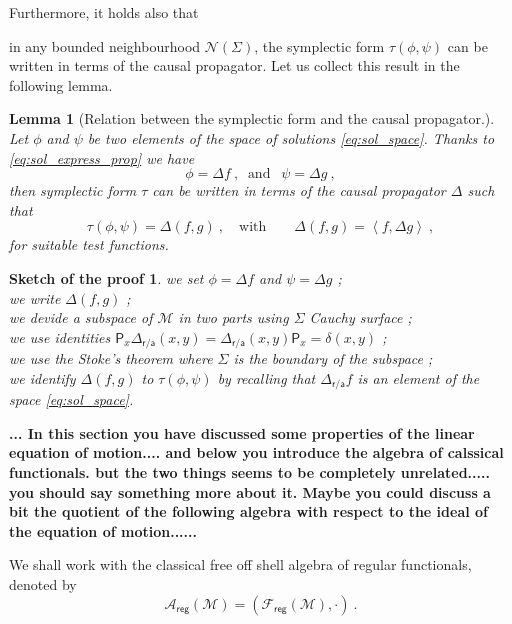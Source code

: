 \documentclass[11pt]{book}
\newcommand{\com}[1]{{\color{red}\bf #1}}
\newcommand{\reg}{\mathsf{reg}}
\newcommand{\sm}[1]{\left\langle#1\right\rangle}
\newcommand{\Acal}{\mathcal{A}}
\newcommand{\Fcal}{\mathcal{F}}
\newcommand{\Mcal}{\mathcal{M}}
\newcommand{\Ncal}{\mathcal{N}}
\newcommand{\Psf}{\mathsf{P}}
\newcommand{\asf}{\mathsf{a}}
\newcommand{\rsf}{\mathsf{r}}
\theoremstyle{break}
\newtheorem{lemma}{Lemma}[chapter]
\newtheorem{sketch}{Sketch of the proof}[chapter]
\begin{document}
Furthermore, it holds also that 

in any bounded neighbourhood $\Ncal(\Sigma)$, the symplectic form $\tau(\phi, \psi)$ can be written in terms of the causal propagator. Let us collect this result in the following lemma.


\begin{lemma}[Relation between the symplectic form and the causal propagator.]
Let $\phi$ and $\psi$ be two elements of the space of solutions \eqref{eq:sol_space}. Thanks to \eqref{eq:sol_express_prop} we have 
%
\begin{equation*}
\phi = \Delta f \ , \  \mbox{ and } \ \ \psi = \Delta g \ ,  
\end{equation*}
%
then symplectic form $\tau$ can be written in terms of the causal propagator $\Delta$ such that
%
\begin{equation*}
\tau(\phi,\psi) = \Delta(f,g) \ , \quad \mbox{with} \qquad \Delta(f,g) = \sm{f,\Delta g} \ ,
\end{equation*}
%
for suitable test functions. 
\end{lemma}


\com{
\begin{sketch}
we set $\phi = \Delta f$ and $\psi = \Delta g$ ; \\
we write $\Delta(f,g)$ ; \\
we devide a subspace of $\Mcal$ in two parts using $\Sigma$ Cauchy surface ; \\
we use identities $\Psf_x \Delta_{\rsf/\asf}(x,y) = \Delta_{\rsf/\asf}(x,y) \Psf_x = \delta(x,y)$ ; \\
we use the Stoke's theorem where $\Sigma$ is the boundary of the subspace ; \\
we identify $\Delta(f,g)$ to $\tau(\phi,\psi)$ by recalling that $\Delta_{\rsf/\asf}f$ is an element of the space \eqref{eq:sol_space}.
\end{sketch}
}

\bigskip


\com{... In this section you have discussed some properties of the linear equation of motion.... and below you introduce the algebra of calssical functionals. but the two things seems to be completely unrelated..... you should say something more about it. Maybe you could discuss a bit the quotient of the following algebra with respect to the ideal of the equation of motion......  }


\bigskip


We shall work with the classical free off shell algebra of regular functionals, denoted by
%
\begin{equation}
\Acal_\reg(\Mcal) = \left(\Fcal_\reg(\Mcal), \cdot\right) \ . 
\label{eq:alg_clas_reg}
\end{equation}
\end{document}
